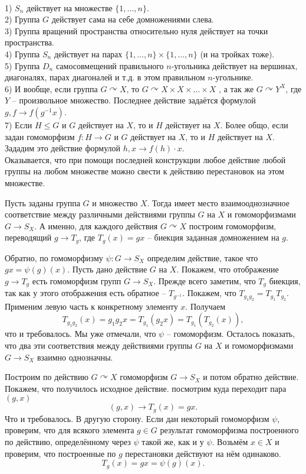 \exm \\
1) $S_n$ действует на множестве $\{1,\dots,n\}$.\\
2) Группа $G$ действует сама на себе домножениями слева.\\
3) Группа вращений пространства относительно нуля действует на точки пространства.\\
4) Группа $S_n$ действует на парах $\{1,\dots,n\}\times \{1,\dots,n\}$ (и на тройках тоже).\\
5) Группа $D_n$ самосовмещений правильного $n$-угольника действует на вершинах, диагоналях, парах диагоналей и т.д. в этом правильном $n$-угольнике.\\
6) И вообще, если группа $G\curvearrowright X$, то $G \curvearrowright X\times X\times \dots \times X$ , а так же $G \curvearrowright Y^X$, где $Y$ -- произвольное множество. Последнее действие задаётся формулой $g,f \to f(g^{-1}x)$.\\
7) Если $H\leq G$ и $G$ действует на $X$, то и $H$ действует на $X$. Более общо, если задан гомоморфизм $f\colon H \to G$ и $G$ действует на $X$, то и $H$ действует на $X$. Зададим это действие формулой $h,x \to f(h)\cdot x$.\\

Оказывается, что при помощи последней конструкции любое действие любой группы на любом множестве можно свести к действию перестановок на этом множестве.


\thrm
Пусть заданы группа $G$ и множество $X$. Тогда имеет место взаимооднозначное соответствие между различными действиями группы $G$ на $X$ и  гомоморфизмами $G \to S_X$. А именно, для каждого действия $G \curvearrowright X$ построим гомоморфизм, переводящий $g \to T_g$, где $T_g(x)=gx$ -- биекция заданная домножением на $g$. 

Обратно, по гомоморфизму $\psi \colon G \to S_X$ определим действие, такое что $gx=\psi(g)(x)$.
\ethrm
\proof
Пусть дано действие $G$ на $X$. Покажем, что отображение $g \to T_g$ есть гомоморфизм групп $G \to S_X$.  Прежде всего заметим, что $T_g$ биекция, так как у этого отображения есть обратное -- $T_{g^{-1}}$. 
Покажем, что $T_{g_1g_2}=T_{g_1}T_{g_2}$. Применим  левую часть к конкретному элементу $x$. Получаем $$T_{g_1g_2}(x)=g_1g_2x=T_{g_1}(g_2x)=T_{g_1}(T_{g_2}(x)),$$
что и требовалось. Мы уже отмечали, что $\psi$ -- гомоморфизм. Осталось показать, что два эти соответствия между действиями группы $G$ на $X$ и гомоморфизмами $G \to S_X$ взаимно однозначны. 

Построим по действию $G \curvearrowright X$ гомоморфизм $G \to S_X$ и потом обратно действие. Покажем, что получилось исходное действие. посмотрим куда переходит пара $(g,x)$
$$(g,x) \to T_g(x)=gx.$$
Что и требовалось. В другую сторону. Если дан некоторый гомоморфизм $\psi$, проверим, что для всякого элемента $g\in G$ результат гомоморфизма построенного по действию, определённому через $\psi$ такой же, как и у $\psi$. Возьмём $x\in X$ и проверим, что построенные по $g$ перестановки действуют на нём одинаково. 
$$T_g(x)=gx=\psi(g)(x).$$
\endproof

